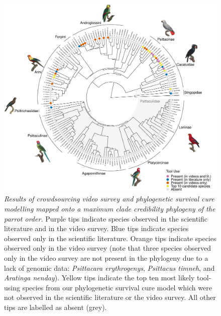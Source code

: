 \documentclass[
  man,floatsintext]{apa6}
\begin{document}
\begin{figure}
\centering
\includegraphics{manuscript_files/figure-latex/plotPhylo1-1.pdf}
\caption{\label{fig:plotPhylo1}\emph{Results of crowdsourcing video survey and phylogenetic survival cure modelling mapped onto a maximum clade credibility phylogeny of the parrot order.} Purple tips indicate species observed in the scientific literature and in the video survey. Blue tips indicate species observed only in the scientific literature. Orange tips indicate species observed only in the video survey (note that three species observed only in the video survey are not present in the phylogeny due to a lack of genomic data: \emph{Psittacara erythrogenys}, \emph{Psittacus timneh}, and \emph{Aratinga nenday}). Yellow tips indicate the top ten most likely tool-using species from our phylogenetic survival cure model which were not observed in the scientific literature or the video survey. All other tips are labelled as absent (grey).}
\end{figure}
\end{document}
